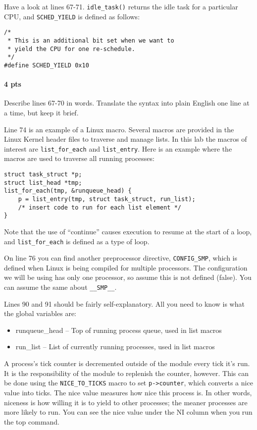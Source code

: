 \documentclass[letterpaper,10pt]{article}
\begin{document}
Have a look at lines 67-71. \verb=idle_task()= returns the idle task for a particular CPU, and
\verb=SCHED_YIELD= is defined as follows:
\begin{verbatim}
/*
 * This is an additional bit set when we want to
 * yield the CPU for one re-schedule.
 */
#define SCHED_YIELD 0x10
\end{verbatim}

\paragraph{4 pts} Describe lines 67-70 in words. Translate the syntax into plain English one line at a time, but keep it brief.

Line 74 is an example of a Linux macro. Several macros are provided in the
Linux Kernel header files to traverse and manage lists. In this lab the macros of interest
are \verb=list_for_each= and \verb=list_entry=. Here is an example where the macros are used to
traverse all running processes:

\begin{verbatim}
struct task_struct *p;
struct list_head *tmp;
list_for_each(tmp, &runqueue_head) {
    p = list_entry(tmp, struct task_struct, run_list);
    /* insert code to run for each list element */
}
\end{verbatim}

Note that the use of ``continue'' causes execution to resume at the start of a loop, and
\verb=list_for_each= is defined as a type of loop.

On line 76 you can find another preprocessor directive, \verb=CONFIG_SMP=, which is defined
when Linux is being compiled for multiple processors. The configuration we will be using
has only one processor, so assume this is not defined (false). You can assume the same
about \verb=__SMP__=.

Lines 90 and 91 should be fairly self-explanatory. All you need to know is what the global
variables are:
\begin{itemize}
 \item runqueue\_head -- Top of running process queue, used in list macros
 \item run\_list -- List of currently running processes, used in list macros
\end{itemize}

A process's tick counter is decremented outside of the module every tick it's run. It is the
responsibility of the module to replenish the counter, however. This can be done using
the \verb=NICE_TO_TICKS= macro to set \verb=p->counter=, which converts a nice value into ticks.
The nice value measures how nice this process is. In other words, niceness is how
willing it is to yield to other processes; the meaner processes are more likely to run. You
can see the nice value under the NI column when you run the top command.
\end{document}
